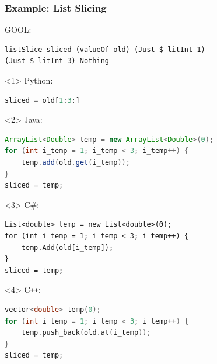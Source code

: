 \documentclass{beamer}
\newcommand{\Csharp}{C\#}
\newcommand{\Cplusplus}{C\texttt{++}}
\begin{document}

\begin{frame}[fragile]

\frametitle{Example: List Slicing}

GOOL:
\begin{lstlisting}
listSlice sliced (valueOf old) (Just $ litInt 1)
(Just $ litInt 3) Nothing
\end{lstlisting}
\vspace{\baselineskip}

\begin{onlyenv}<1>
Python:
\begin{lstlisting}[language=Python]
sliced = old[1:3:]
\end{lstlisting}
\end{onlyenv}

\begin{onlyenv}<2>
Java:
\begin{lstlisting}[language=java]
ArrayList<Double> temp = new ArrayList<Double>(0);
for (int i_temp = 1; i_temp < 3; i_temp++) {
    temp.add(old.get(i_temp));
}
sliced = temp;
\end{lstlisting}
\end{onlyenv}

\begin{onlyenv}<3>
\Csharp:
\lstset{language=[Sharp]C}
\begin{lstlisting}
List<double> temp = new List<double>(0);
for (int i_temp = 1; i_temp < 3; i_temp++) {
    temp.Add(old[i_temp]);
}
sliced = temp;
\end{lstlisting}
\lstset{language=haskell}
\end{onlyenv}

\begin{onlyenv}<4>
\Cplusplus:
\begin{lstlisting}[language=C++]
vector<double> temp(0);
for (int i_temp = 1; i_temp < 3; i_temp++) {
    temp.push_back(old.at(i_temp));
}
sliced = temp;
\end{lstlisting}
\end{onlyenv}

\end{frame}

\end{document}
